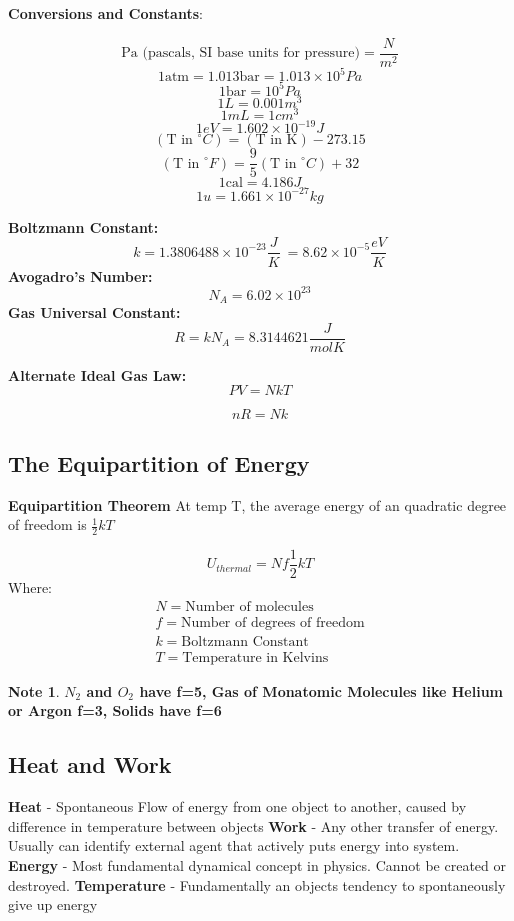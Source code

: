 \documentclass[11pt]{article}
\theoremstyle{definition}
\newtheorem{note}{Note}
\begin{document}
\textbf{Conversions and Constants}:

\[\text{Pa (pascals, SI base units for pressure)} = \frac{N}{m^2}\]
\[1 \text{atm} = 1.013 \text{bar} = 1.013 \times 10^{5} Pa\]
\[1 \text{bar} = 10^5Pa\]
\[1 L = 0.001m^3\]
\[1 mL = 1cm^3\]
\[ 1eV = 1.602 \times 10^{-19}J\]
\[ (\text{T in }^\circ C) = (\text{T in K}) - 273.15\]
\[ (\text{T in }^\circ F) = \frac{9}{5}(\text{T in }^\circ C) +32\]
\[1 \text{cal} = 4.186J\]
\[1 u = 1.661 \times 10^{-27} kg\]

\textbf{Boltzmann Constant:}
\[k= 1.3806488 \times 10^{-23} \frac{J}{K}\ = 8.62 \times 10^{-5}\frac{eV}{K}\]
\textbf{Avogadro's Number:}
\[N_A = 6.02 \times 10^{23}\]
\textbf{Gas Universal Constant:}
\[R = k N_A = 8.3144621 \frac{J}{mol K}\]

\textbf{Alternate Ideal Gas Law:}
\[PV = NkT\]

\[nR = Nk\]


\subsection{The Equipartition of Energy}
\begin{shaded}
\textbf{Equipartition Theorem}\newline 
At temp T, the average energy of an quadratic degree of freedom is $\frac{1}{2}kT$

\begin{equation}
U_{thermal} = Nf \frac{1}{2} kT
\end{equation}
Where:
\begin{equation*}
\begin{split}
N = \text{Number of molecules} \\
f = \text{Number of degrees of freedom} \\
k = \text{Boltzmann Constant}\\
T = \text{Temperature in Kelvins}
\end{split}
\end{equation*}
\end{shaded}
\begin{note}

\textbf{$N_2$ and $O_2$ have f=5, Gas of Monatomic Molecules like Helium or Argon f=3, Solids have f=6}
\end{note}


\subsection{Heat and Work}
\textbf{Heat} - Spontaneous Flow of energy from one object to another, caused by difference in temperature between objects \newline
\textbf{Work} - Any other transfer of energy. Usually can identify external agent that actively puts energy into system.\newline
\textbf{Energy} - Most fundamental dynamical concept in physics. Cannot be created or destroyed.\newline
\textbf{Temperature} - Fundamentally an objects tendency to spontaneously give up energy \newline
\end{document}
